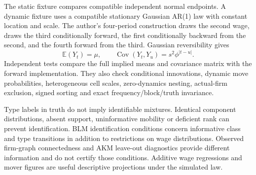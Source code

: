 \documentclass[11pt,letterpaper]{article}
\newcommand{\E}{\mathbb{E}}
\newcommand{\Cov}{\operatorname{Cov}}
\begin{document}
The static fixture compares compatible independent normal endpoints. A dynamic
fixture uses a compatible stationary Gaussian AR(1) law with constant location
and scale. The author's four-period construction draws the second wage, draws
the third conditionally forward, the first conditionally backward from the
second, and the fourth forward from the third. Gaussian reversibility gives
\[
 \E(Y_t)=\mu,\qquad
 \Cov(Y_t,Y_u)=s^2\phi^{|t-u|}.
\]
Independent tests compare the full implied means and covariance matrix with the
forward implementation. They also check conditional innovations, dynamic move
probabilities, heterogeneous cell scales, zero-dynamics nesting, actual-firm
exclusion, signed sorting and exact frequency/block/truth invariance.

Type labels in truth do not imply identifiable mixtures. Identical component
distributions, absent support, uninformative mobility or deficient rank can
prevent identification. BLM identification conditions concern informative
class and type transitions in addition to restrictions on wage distributions.
Observed firm-graph connectedness and AKM leave-out diagnostics provide different
information and do not certify those conditions. Additive wage regressions and
mover figures are useful descriptive projections under the simulated law.
\end{document}
